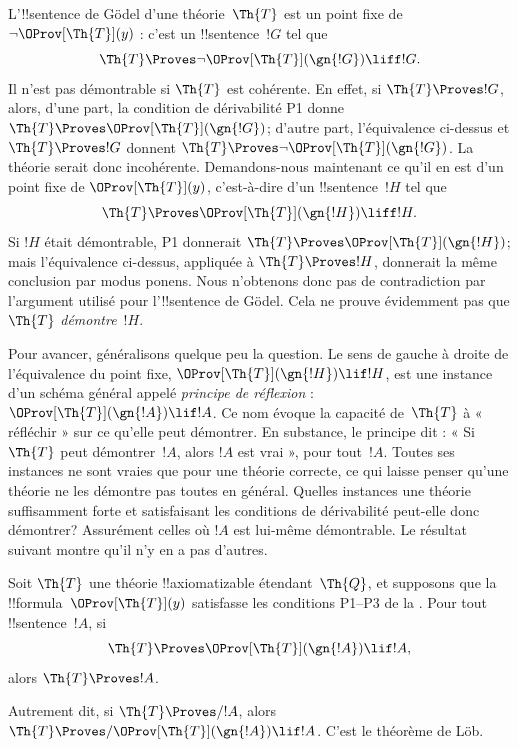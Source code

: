 \documentclass[../../../include/open-logic-section]{subfiles}
\begin{document}


L'!!{sentence} de Gödel d'une théorie~$\Th{T}$
est un point fixe de $\lnot\OProv[\Th{T}](y)$ :
c'est un !!{sentence}~$!G$ tel que
\[
\Th{T}\Proves\lnot\OProv[\Th{T}](\gn{!G})
\liff !G.
\]
Il n'est pas démontrable si $\Th{T}$ est
cohérente. En effet, si $\Th{T}\Proves !G$,
alors, d'une part, la condition de dérivabilité
P1 donne
$\Th{T}\Proves\OProv[\Th{T}](\gn{!G})$;
d'autre part, l'équivalence ci-dessus et
$\Th{T}\Proves !G$ donnent
$\Th{T}\Proves\lnot\OProv[\Th{T}](\gn{!G})$.
La théorie serait donc incohérente. Demandons-nous
maintenant ce qu'il en est d'un point fixe de
$\OProv[\Th{T}](y)$, c'est-à-dire d'un
!!{sentence}~$!H$ tel que
\[
\Th{T}\Proves\OProv[\Th{T}](\gn{!H})
\liff !H.
\]
Si $!H$ était démontrable, P1 donnerait
$\Th{T}\Proves\OProv[\Th{T}](\gn{!H})$;
mais l'équivalence ci-dessus, appliquée à
$\Th{T}\Proves !H$, donnerait la même conclusion
par modus ponens. Nous n'obtenons donc pas de
contradiction par l'argument utilisé pour
l'!!{sentence} de Gödel. Cela ne prouve évidemment
pas que $\Th{T}$ \emph{démontre}~$!H$.

Pour avancer, généralisons quelque peu la question.
Le sens de gauche à droite de l'équivalence du
point fixe,
$\OProv[\Th{T}](\gn{!H})\lif !H$,
est une instance d'un schéma général appelé
\emph{principe de réflexion} :
$\OProv[\Th{T}](\gn{!A})\lif !A$.
Ce nom évoque la capacité de~$\Th{T}$ à
« réfléchir » sur ce qu'elle peut démontrer.
En substance, le principe dit : « Si $\Th{T}$
peut démontrer~$!A$, alors $!A$ est vrai », pour
tout~$!A$. Toutes ses instances ne sont vraies
que pour une théorie correcte, ce qui laisse penser
qu'une théorie ne les démontre pas toutes en
général. Quelles instances une théorie suffisamment
forte et satisfaisant les conditions de dérivabilité
peut-elle donc démontrer? Assurément celles où
$!A$ est lui-même démontrable. Le résultat suivant
montre qu'il n'y en a pas d'autres.

\begin{thm}
Soit $\Th{T}$ une théorie !!{axiomatizable}
étendant~$\Th{Q}$, et supposons que la
!!{formula}~$\OProv[\Th{T}](y)$ satisfasse les
conditions P1--P3 de la . Pour tout
!!{sentence}~$!A$, si
\[
\Th{T}\Proves\OProv[\Th{T}](\gn{!A})\lif !A,
\]
alors $\Th{T}\Proves !A$.
\end{thm}

Autrement dit, si $\Th{T}\Proves/ !A$, alors
$\Th{T}\Proves/
\OProv[\Th{T}](\gn{!A})\lif !A$.
C'est le théorème de Löb.
\end{document}
